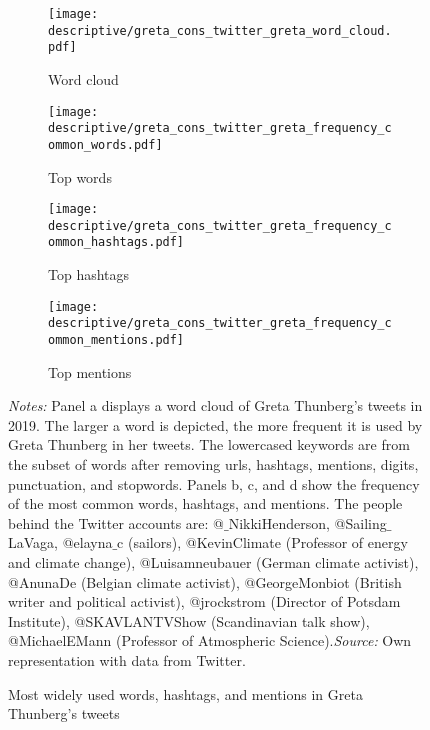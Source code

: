 


\vspace*{\fill}
	\begin{figure}[H]\centering
		\begin{subfigure}[h]{0.49\linewidth}\centering\caption{Word cloud}
			\texttt{[image: descriptive/greta\_cons\_twitter\_greta\_word\_cloud.pdf]}
		\end{subfigure}
		\begin{subfigure}[h]{0.49\linewidth}\centering\caption{Top words}
			\texttt{[image: descriptive/greta\_cons\_twitter\_greta\_frequency\_common\_words.pdf]}
		\end{subfigure}
		
		\begin{subfigure}[h]{0.49\linewidth}\centering\caption{Top hashtags}
			\texttt{[image: descriptive/greta\_cons\_twitter\_greta\_frequency\_common\_hashtags.pdf]}
		\end{subfigure}
		\begin{subfigure}[h]{0.49\linewidth}\centering\caption{Top mentions}
			\texttt{[image: descriptive/greta\_cons\_twitter\_greta\_frequency\_common\_mentions.pdf]}
		\end{subfigure}
		\scriptsize
		\begin{minipage}{\linewidth}
			\caption{Most widely used words, hashtags, and mentions in Greta Thunberg's tweets}
			\label{fig_greta_cons:twitter_greta_thunberg_top_words_hashtags_mentions}
			\scriptsize{\emph{Notes:} Panel a displays a word cloud of Greta Thunberg's tweets in 2019. The larger a word is depicted, the more frequent it is used by Greta Thunberg in her tweets. The lowercased keywords are from the subset of words after removing urls, hashtags, mentions, digits, punctuation, and stopwords. Panels b, c, and d show the frequency of the most common words, hashtags, and mentions. The people behind the Twitter accounts are: @$\_$NikkiHenderson, @Sailing$\_$LaVaga, @elayna$\_$c (sailors), @KevinClimate (Professor of energy and climate change), @Luisamneubauer (German climate activist), @AnunaDe (Belgian climate activist), @GeorgeMonbiot (British writer and political activist), @jrockstrom (Director of Potsdam Institute), @SKAVLANTVShow (Scandinavian talk show), @MichaelEMann (Professor of Atmospheric Science).\newline\emph{Source:} Own representation with data from Twitter.}
		\end{minipage}
	\end{figure}
